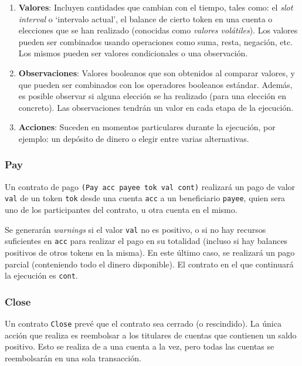 \documentclass[12pt]{book}
\begin{document}
\begin{enumerate}
	\item \textbf{Valores}: Incluyen cantidades que cambian con el tiempo, tales como: el \textit{slot interval} o `intervalo actual', el balance de cierto token en una cuenta o elecciones que se han realizado (conocidas como \textit{valores volátiles}). Los valores pueden ser combinados usando operaciones como suma, resta, negación, etc. Los mismos pueden ser valores condicionales o una observación.

	\item \textbf{Observaciones}: Valores booleanos que son obtenidos al comparar valores, y que pueden ser combinados con los operadores booleanos estándar. Además, es posible observar si alguna elección se ha realizado (para una elección en concreto). Las observaciones tendrán un valor en cada etapa de la ejecución.

	\item \textbf{Acciones}: Suceden en momentos particulares durante la ejecución, por ejemplo: un depósito de dinero o elegir entre varias alternativas.
\end{enumerate}


\subsubsection{Pay}
Un contrato de pago \texttt{(Pay acc payee tok val cont)} realizará un pago de valor \texttt{val} de un token \texttt{tok} desde una cuenta \texttt{acc} a un beneficiario \texttt{payee}, quien sera uno de los participantes del contrato, u otra cuenta en el mismo.

Se generarán \textit{warnings} si el valor \texttt{val} no es positivo, o si no hay recursos suficientes en \texttt{acc} para realizar el pago en su totalidad (incluso si hay balances positivos de otros tokens en la misma). En este último caso, se realizará un pago parcial (conteniendo todo el dinero disponible). El contrato en el que continuará la ejecución es \texttt{cont}.

\subsubsection{Close}

Un contrato \texttt{Close} prevé que el contrato sea cerrado (o rescindido). La única acción que realiza es reembolsar a los titulares de cuentas que contienen un saldo positivo. Esto se realiza de a una cuenta a la vez, pero todas las cuentas se reembolsarán en una sola transacción.
\end{document}
